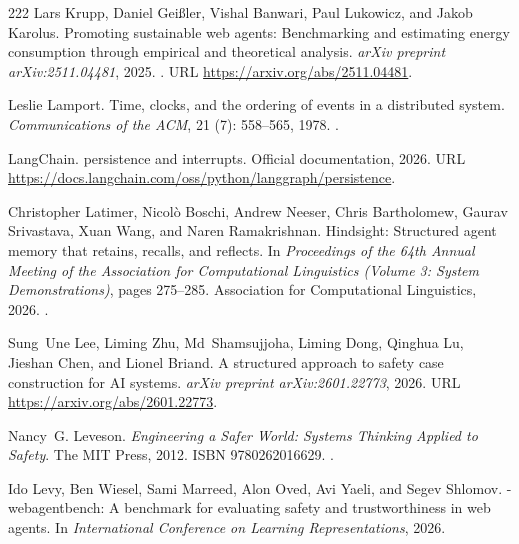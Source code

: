 \begin{thebibliography}{222}
Lars Krupp, Daniel Gei{\ss}ler, Vishal Banwari, Paul Lukowicz, and Jakob
  Karolus.
\newblock Promoting sustainable web agents: Benchmarking and estimating energy
  consumption through empirical and theoretical analysis.
\newblock \emph{arXiv preprint arXiv:2511.04481}, 2025.
\newblock {}.
\newblock URL \url{https://arxiv.org/abs/2511.04481}.

Leslie Lamport.
\newblock Time, clocks, and the ordering of events in a distributed system.
\newblock \emph{Communications of the ACM}, 21 (7): 558--565,
  1978.
\newblock {}.

{LangChain}.
 persistence and interrupts.
\newblock Official documentation, 2026.
\newblock URL
  \url{https://docs.langchain.com/oss/python/langgraph/persistence}.

Christopher Latimer, Nicol{\`o} Boschi, Andrew Neeser, Chris Bartholomew,
  Gaurav Srivastava, Xuan Wang, and Naren Ramakrishnan.
\newblock Hindsight: Structured agent memory that retains, recalls, and
  reflects.
\newblock In \emph{Proceedings of the 64th Annual Meeting of the Association
  for Computational Linguistics (Volume 3: System Demonstrations)}, pages
  275--285. Association for Computational Linguistics, 2026.
\newblock {}.

Sung~Une Lee, Liming Zhu, Md~Shamsujjoha, Liming Dong, Qinghua Lu, Jieshan
  Chen, and Lionel Briand.
\newblock A structured approach to safety case construction for {AI} systems.
\newblock \emph{arXiv preprint arXiv:2601.22773}, 2026.
\newblock URL \url{https://arxiv.org/abs/2601.22773}.

Nancy~G. Leveson.
\newblock \emph{Engineering a Safer World: Systems Thinking Applied to Safety}.
\newblock The MIT Press, 2012.
\newblock ISBN 9780262016629.
\newblock {}.

Ido Levy, Ben Wiesel, Sami Marreed, Alon Oved, Avi Yaeli, and Segev Shlomov.
-webagentbench: A benchmark for evaluating safety and
  trustworthiness in web agents.
\newblock In \emph{International Conference on Learning Representations}, 2026.


\end{thebibliography}
